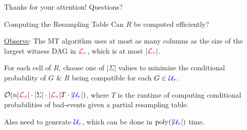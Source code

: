 \documentclass{beamer}
\def\spadding{\vspace{0.25cm}}
\begin{document}

\begin{frame}{}
    \centering \large
    Thanks for your attention!
    Questions?
\end{frame}

\appendix

\begin{frame}{Computing the Resampling Table}
Can $R$ be computed efficiently?\pause\spadding

\underline{Observe}: The MT algorithm uses at most as many columns as the size of the largest witness DAG in $\textcolor{red}{\mathcal{L}_\tau}$\pause, which is at most $|\textcolor{red}{\mathcal{L}_\tau}|$.\pause\spadding

For each cell of $R$, choose one of $|\Sigma|$ values to minimize the conditional probability of $G$ \& $R$ being compatible for each $G \in \textcolor{blue}{\mathcal{U}_\tau}$.\pause\spadding

\follows $\mathcal{O}(n |\textcolor{red}{\mathcal{L}_\tau}| \cdot |\Sigma| \cdot |\textcolor{red}{\mathcal{L}_\tau}| T \cdot |\textcolor{blue}{\mathcal{U}_\tau}|)$\pause, where $T$ is the runtime of computing conditional probabilities of bad-events given a partial resampling table.\pause\par
Also need to generate $\textcolor{blue}{\mathcal{U}_\tau}$, which can be done in $\mathrm{poly}(|\textcolor{blue}{\mathcal{U}_\tau}|)$ time.
\end{frame}
\end{document}
